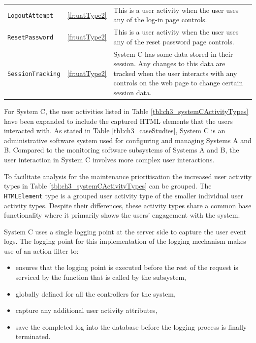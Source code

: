 \begin{table}[!htb]
\begin{tabularx}{\textwidth}{llX}
		\rowcolor{lightgray}
		\texttt{LogoutAttempt} & \ref{fr:uatType2} & \RaggedRight This is a user activity when the user uses any of the log-in page controls. \\
		\texttt{ResetPassword} & \ref{fr:uatType2} & \RaggedRight This is a user activity when the user uses any of the reset password page controls. \\
		\rowcolor{lightgray}
		\texttt{SessionTracking} & \ref{fr:uatType2} & \RaggedRight System C has some data stored in their session. Any changes to this data are tracked when the user interacts with any controls on the web page to change certain session data. \\
		\bottomrule
	\end{tabularx}
\end{table}

For System C, the user activities listed in Table \ref{tbl:ch3_systemCActivityTypes} have been expanded to include the captured HTML elements that the users interacted with. As stated in Table \ref{tbl:ch3_caseStudies}, System C is an administrative software system used for configuring and managing Systems A and B. Compared to the monitoring software subsystems of Systems A and B, the user interaction in System C involves more complex user interactions.\par To facilitate analysis for the maintenance prioritisation the increased user activity types in Table \ref{tbl:ch3_systemCActivityTypes} can be grouped. The \texttt{HTMLElement} type is a grouped user activity type of the smaller individual user activity types. Despite their differences, these activity types share a common base functionality where it primarily shows the users' engagement with the system.\par System C uses a single logging point at the server side to capture the user event logs. The logging point for this implementation of the logging mechanism makes use of an action filter to:

\begin{itemize}
	\item ensures that the logging point is executed before the rest of the request is serviced by the function that is called by the subsystem,
	\item globally defined for all the controllers for the system,
	\item capture any additional user activity attributes,
	\item save the completed log into the database before the logging process is finally terminated.
\end{itemize}

